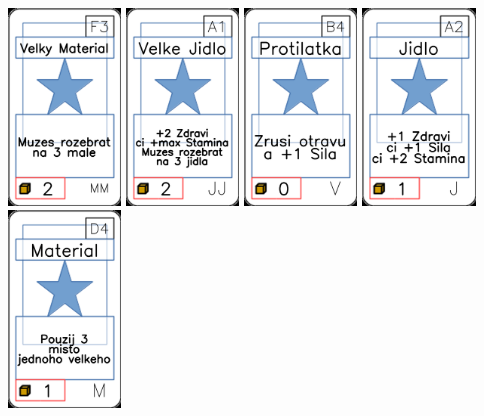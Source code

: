 \documentclass[a4paper]{article}
\begin{document}
	\includegraphics[width=3.0cm]{img-1_57}
	\includegraphics[width=3.0cm]{img-1_30}
	\includegraphics[width=3.0cm]{img-1_68}
	\includegraphics[width=3.0cm]{img-1_1}
	\includegraphics[width=3.0cm]{img-1_48}
\end{document}
